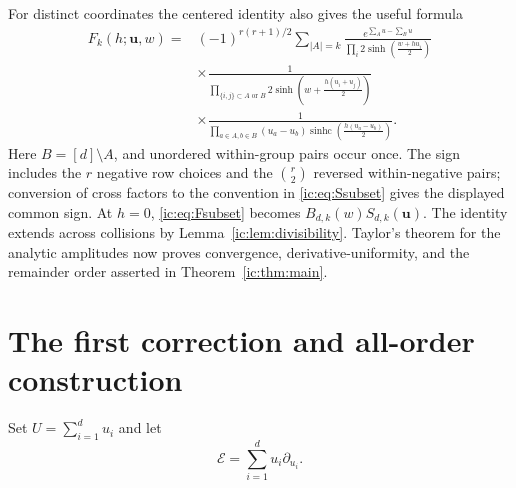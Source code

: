\documentclass[11pt,a4paper]{article}
\numberwithin{equation}{section}
\theoremstyle{definition}
\theoremstyle{remark}
\newcommand{\bu}{\boldsymbol u}
\newcommand{\sinhc}{\operatorname{sinhc}}
\newcommand{\EE}{\mathcal E}
\begin{document}
For distinct coordinates the centered identity also gives the useful
formula
\begin{equation}\label{ic:eq:Fsubset}
\begin{split}
 F_k(h;\bu,w)
 ={}&(-1)^{r(r+1)/2}
 \sum_{|A|=k}\frac{e^{\sum_Au-\sum_Bu}}{
 \displaystyle\prod_i2\sinh\left(\frac{w+hu_i}{2}\right)}\\
 &\times\frac{1}{
 \displaystyle\prod_{\{i,j\}\subset A\text{ or }B}
  2\sinh\left(w+\frac{h(u_i+u_j)}2\right)}\\
 &\times\frac{1}{
 \displaystyle\prod_{a\in A,b\in B}(u_a-u_b)
       \sinhc\left(\frac{h(u_a-u_b)}2\right)}.
\end{split}
\end{equation}
Here $B=[d]\setminus A$, and unordered within-group pairs occur once.
The sign includes the $r$ negative row choices and the
$\binom r2$ reversed within-negative pairs; conversion of cross factors
to the convention in \eqref{ic:eq:Ssubset} gives the displayed common sign.
At $h=0$, \eqref{ic:eq:Fsubset} becomes
$B_{d,k}(w)S_{d,k}(\bu)$. The identity extends across collisions by
Lemma~\ref{ic:lem:divisibility}. Taylor's theorem for the analytic amplitudes
now proves convergence, derivative-uniformity, and the remainder order
asserted in Theorem~\ref{ic:thm:main}.

\section{The first correction and all-order construction}\label{ic:sec:first}
Set $U=\sum_{i=1}^d u_i$ and let
\begin{equation}\label{ic:eq:Euler}
 \EE=\sum_{i=1}^d u_i\partial_{u_i}.
\end{equation}
\end{document}
